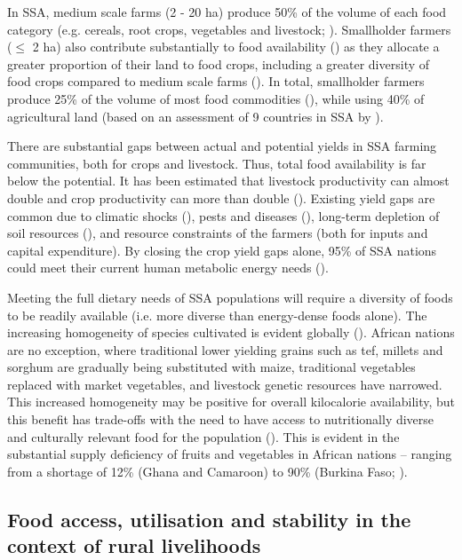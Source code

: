 In SSA, medium scale farms (2 - 20 ha) produce 50\% of the volume of each food category (e.g. cereals, root crops, vegetables and livestock; \citealp{Herrero2017}). Smallholder farmers (${\leq}$ 2 ha) also contribute substantially to food availability (\citealp{Samberg2016}) as they allocate a greater proportion of their land to food crops, including a greater diversity of food crops compared to medium scale farms (\citealp{Ricciardi2018}). In total, smallholder farmers produce 25\% of the volume of most food commodities (\citealp{Herrero2017}), while using 40\% of agricultural land (based on an assessment of 9 countries in SSA by \citealp{Lowder201616}).

There are substantial gaps between actual and potential yields in SSA farming communities, both for crops and livestock. Thus, total food availability is far below the potential. It has been estimated that livestock productivity can almost double and crop productivity can more than double (\citealp{Henderson2016106}). Existing yield gaps are common due to climatic shocks (\citealp{Gebrechorkos2018}), pests and diseases (\citealp{Biber-freudenberger2016}), long-term depletion of soil resources (\citealp{Tittonell2013}), and resource constraints of the farmers (both for inputs and capital expenditure). By closing the crop yield gaps alone, 95\% of SSA nations could meet their current human metabolic energy needs (\citealp{Luan2018}).

Meeting the full dietary needs of SSA populations will require a diversity of foods to be readily available (i.e. more diverse than energy-dense foods alone). The increasing homogeneity of species cultivated is evident globally (\citealp{Khoury2014}). African nations are no exception, where traditional lower yielding grains such as tef, millets and sorghum are gradually being substituted with maize, traditional vegetables replaced with market vegetables, and livestock genetic resources have narrowed. This increased homogeneity may be positive for overall kilocalorie availability, but this benefit has trade-offs with the need to have access to nutritionally diverse and culturally relevant food for the population (\citealp{Schipanski2016, Pingali2015, Remans2014, Popkin2001}). This is evident in the substantial supply deficiency of fruits and vegetables in African nations -- ranging from a shortage of 12\% (Ghana and Camaroon) to 90\% (Burkina Faso; \citealp{Siegel2014}).

\subsection{Food access, utilisation and stability in the context of rural livelihoods}

